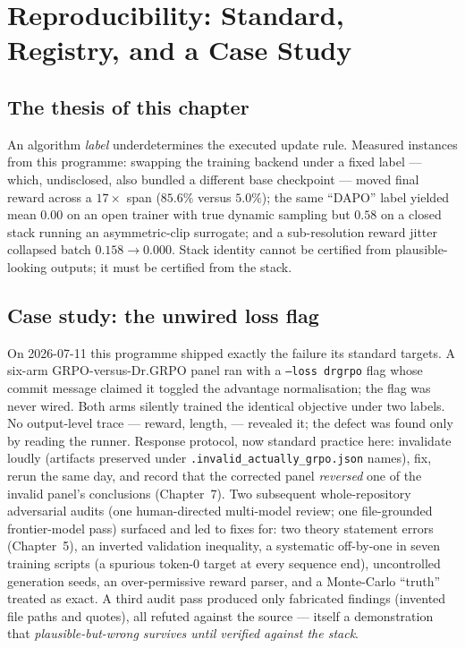 \chapter{Reproducibility: Standard, Registry, and a Case Study}
\label{ch:repro}

\section{The thesis of this chapter}
An algorithm \emph{label} underdetermines the executed update rule. Measured
instances from this programme: swapping the training backend under a fixed
label --- which, undisclosed, also bundled a different base checkpoint ---
moved final reward across a $17\times$ span ($85.6\%$ versus $5.0\%$); the
same ``DAPO'' label yielded mean \ZVF{} $0.00$ on an open trainer with true
dynamic sampling but $0.58$ on a closed stack running an asymmetric-clip
surrogate; and a sub-resolution reward jitter collapsed batch \ZVF{}
$0.158\to0.000$. Stack identity cannot be certified from plausible-looking
outputs; it must be certified from the stack.

\section{Case study: the unwired loss flag}
On 2026-07-11 this programme shipped exactly the failure its standard targets.
A six-arm GRPO-versus-Dr.GRPO panel ran with a \texttt{--loss drgrpo} flag
whose commit message claimed it toggled the advantage normalisation; the flag
was never wired. Both arms silently trained the identical objective under two
labels. No output-level trace --- reward, length, \ZVF{} --- revealed it; the
defect was found only by reading the runner. Response protocol, now standard
practice here: invalidate loudly (artifacts preserved under
\texttt{.invalid\_actually\_grpo.json} names), fix, rerun the same day, and
record that the corrected panel \emph{reversed} one of the invalid panel's
conclusions (Chapter~7). Two subsequent whole-repository adversarial audits
(one human-directed multi-model review; one file-grounded frontier-model pass)
surfaced and led to fixes for: two theory statement errors (Chapter~5), an
inverted validation inequality, a systematic off-by-one in seven training
scripts (a spurious token-0 target at every sequence end), uncontrolled
generation seeds, an over-permissive reward parser, and a Monte-Carlo
``truth'' treated as exact. A third audit pass produced only fabricated
findings (invented file paths and quotes), all refuted against the source ---
itself a demonstration that \emph{plausible-but-wrong survives until verified
against the stack}.

